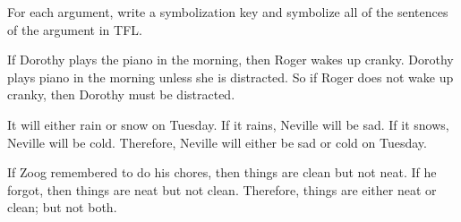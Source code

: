 \problempart
For each argument, write a symbolization key and symbolize all of the sentences of the argument in TFL.
\begin{earg}
\item If Dorothy plays the piano in the morning, then Roger wakes up cranky. Dorothy plays piano in the morning unless she is distracted. So if Roger does not wake up cranky, then Dorothy must be distracted.
\item[] 
\item It will either rain or snow on Tuesday. If it rains, Neville will be sad. If it snows, Neville will be cold. Therefore, Neville will either be sad or cold on Tuesday.
\item[] 
\item If Zoog remembered to do his chores, then things are clean but not neat. If he forgot, then things are neat but not clean. Therefore, things are either neat or clean; but not both.
\item[] 
\end{earg}

